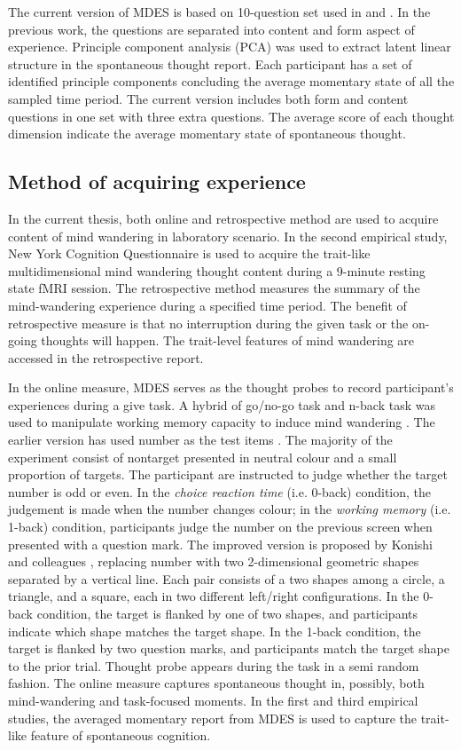 The current version of MDES is based on 10-question set used in \cite{Medea2016} and . In the previous work, the questions are separated into content and form aspect of experience. Principle component analysis (PCA) was used to extract latent linear structure in the spontaneous thought report. Each participant has a set of identified principle components concluding the average momentary state of all the sampled time period. The current version includes both form and content questions in one set with three extra questions. The average score of each thought dimension indicate the average momentary state of spontaneous thought.

\subsection{Method of acquiring experience}

In the current thesis, both online and retrospective method are used to acquire content of mind wandering in laboratory scenario. In the second empirical study, New York Cognition Questionnaire \cite{Gorgolewski2014} is used to acquire the trait-like multidimensional mind wandering thought content during a 9-minute resting state fMRI session. The retrospective method measures the summary of the mind-wandering experience during a specified time period. The benefit of retrospective measure is that no interruption during the given task or the on-going thoughts will happen. The trait-level features of mind wandering are accessed in the retrospective report. 

In the online measure, MDES serves as the thought probes to record participant's experiences during a give task. A hybrid of go/no-go task and n-back task was used to manipulate working memory capacity to induce mind wandering \cite{Konishi2015, Medea2016}. The earlier version has used number as the test items \cite{SmallwoodNI2013,SmallwoodPlos2011}. The majority of the experiment consist of nontarget presented in neutral colour and a small proportion of targets. The participant are instructed to judge whether the target number is odd or even. In the \textit{choice reaction time} (i.e. 0-back) condition, the judgement is made when the number changes colour; in the \textit{working memory} (i.e. 1-back) condition, participants judge the number on the previous screen when presented with a question mark. The improved version is proposed by Konishi and colleagues \citeyear{Konishi2015}, replacing number with two 2-dimensional geometric shapes separated by a vertical line. Each pair consists of a two shapes among a circle, a triangle, and a square, each in two different left/right configurations. In the 0-back condition, the target is flanked by one of two shapes, and participants indicate which shape matches the target shape. In the 1-back condition, the target is flanked by two question marks, and participants match the target shape to the prior trial. Thought probe appears during the task in a semi random fashion. The online measure captures spontaneous thought in, possibly, both mind-wandering and task-focused moments. In the first and third empirical studies, the averaged momentary report from MDES is used to capture the trait-like feature of spontaneous cognition.

